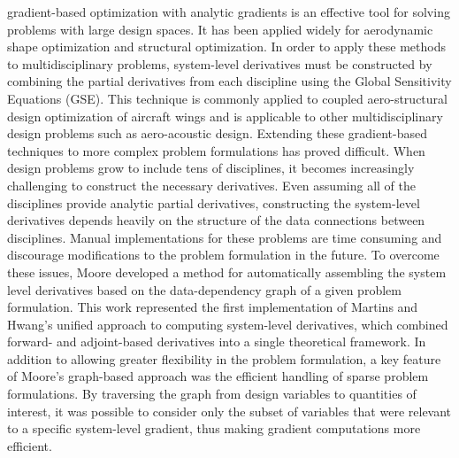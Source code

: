 \documentclass[]{aiaa-tc} %
\begin{document}
    gradient-based optimization with analytic gradients is an effective tool for solving problems
    with large design spaces. It has been applied widely for aerodynamic shape optimization \cite{Liou2010,palacios2012adjoint}
    and structural optimization\cite{Kennedy:2013:TACS, Venkataraman:2004:SOC, Adelman:1986:structure-sensitivity}.
    In order to apply these methods to multidisciplinary problems, system-level derivatives must be
    constructed by combining the partial derivatives from each discipline using the Global Sensitivity
    Equations\cite{Sobieski1990} (GSE). This technique is commonly applied to coupled
    aero-structural design optimization of aircraft wings\cite{Kenway2012c, Haghighat2012} and is applicable to
    other multidisciplinary design problems such as aero-acoustic design\cite{economon2012coupled}. Extending these
    gradient-based techniques to more complex problem formulations has proved difficult. When
    design problems grow to include tens of disciplines, it becomes increasingly challenging to construct the
    necessary derivatives. Even assuming all of the disciplines provide analytic partial derivatives,
    constructing the system-level derivatives depends heavily on the structure of the data connections
    between disciplines. Manual implementations for these problems are time consuming and discourage modifications
    to the problem formulation in the future. To overcome these issues, Moore developed a method for automatically assembling the system
    level derivatives based on the data-dependency graph of a given problem formulation\cite{openmdao_derivatives}. This
    work represented the first implementation of Martins and Hwang's unified approach to computing system-level derivatives,
    which combined forward- and adjoint-based derivatives into a single theoretical framework\cite{martins2013}. 
    In addition to allowing greater flexibility in the problem formulation, a key feature of Moore's graph-based approach was the efficient
    handling of sparse problem formulations. By traversing the graph from design variables to quantities of interest,
    it was possible to consider only the subset of variables that were relevant to a specific system-level gradient, thus
    making gradient computations more efficient.
\end{document}
